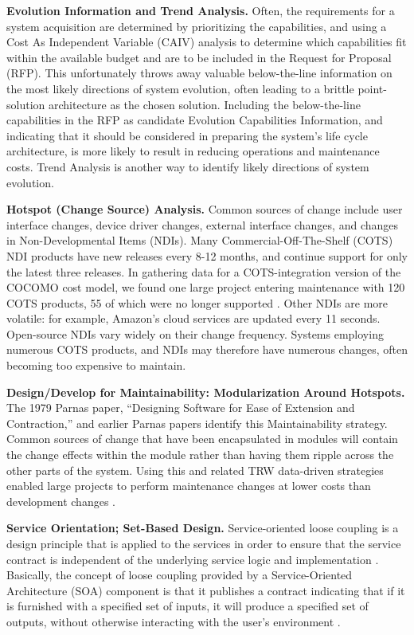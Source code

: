 \textbf{Evolution Information and Trend Analysis.}
Often, the requirements for a system acquisition are determined by prioritizing the capabilities, and using a Cost As Independent Variable (CAIV) analysis to determine which capabilities fit within the available budget and are to be included in the Request for Proposal (RFP).   This unfortunately throws away valuable below-the-line information on the most likely directions of system evolution, often leading to a brittle point-solution architecture as the chosen solution.
Including the below-the-line capabilities in the RFP as candidate Evolution Capabilities Information, and indicating that it should be considered in preparing the system's life cycle architecture, is more likely to result in reducing operations and maintenance costs.
Trend Analysis is another way to identify likely directions of system evolution.

\textbf{Hotspot (Change Source) Analysis.} Common sources of change include user interface changes, device driver changes, external interface changes, and changes in Non-Developmental Items (NDIs).
Many Commercial-Off-The-Shelf (COTS) NDI products have new releases every 8-12 months, and continue support for only the latest three releases.  In gathering data for a COTS-integration version of the COCOMO cost model, we found one large project entering maintenance with 120 COTS products, 55 of which were no longer supported \cite{Abts00cocots:a}.  Other NDIs are more volatile: for example, Amazon's cloud services are updated every 11 seconds.  Open-source NDIs vary widely on their change frequency.  Systems employing numerous COTS products, and NDIs may therefore have numerous changes, often becoming too expensive to maintain.

\textbf{Design/Develop for Maintainability: Modularization Around Hotspots.} The 1979 Parnas paper, ``Designing Software for Ease of Extension and Contraction,'' \cite{parnas1979designing} and earlier Parnas papers identify this Maintainability strategy.   Common sources of change that have been encapsulated in modules will contain the change effects within the module rather than having them ripple across the other parts of the system.    Using this and related TRW data-driven strategies enabled large projects to perform maintenance changes at lower costs than development changes \cite{royce1998software}.   

\textbf{Service Orientation; Set-Based Design.} Service-oriented loose coupling is a design principle that is applied to the services in order to ensure that the service contract is independent of the underlying service logic and implementation \cite{sundbo2000innovation}. Basically, the concept of loose coupling provided by a Service-Oriented Architecture (SOA) component is that it publishes a contract indicating that if it is furnished with a specified set of inputs, it will produce a specified set of outputs, without otherwise interacting with the user's environment \cite{boehm2008balancing,borges2004delving}.

